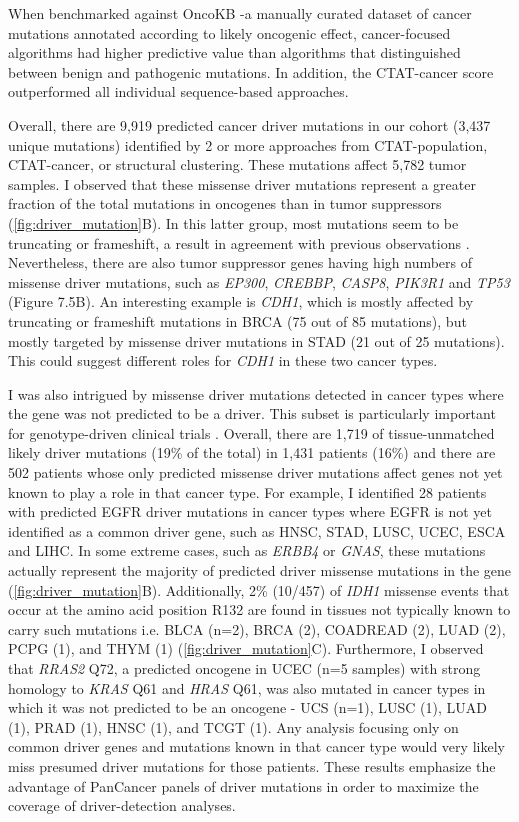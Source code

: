 When benchmarked against OncoKB \cite{RN144}-a manually curated dataset of cancer mutations annotated according to likely oncogenic effect, cancer-focused algorithms had higher predictive value than algorithms that distinguished between benign and pathogenic mutations. In addition, the CTAT-cancer score outperformed all individual sequence-based approaches. 

Overall, there are 9,919 predicted cancer driver mutations in our cohort (3,437 unique mutations) identified by 2 or more approaches from CTAT-population, CTAT-cancer, or structural clustering. These mutations affect 5,782 tumor samples. I observed that these missense driver mutations represent a greater fraction of the total mutations in oncogenes than in tumor suppressors (\autoref{fig:driver_mutation}B). In this latter group, most mutations seem to be truncating or frameshift, a result in agreement with previous observations \cite{RN185}. Nevertheless, there are also tumor suppressor genes having high numbers of missense driver mutations, such as \textit{EP300}, \textit{CREBBP}, \textit{CASP8}, \textit{PIK3R1} and \textit{TP53} (Figure 7.5B). An interesting example is \textit{CDH1}, which is mostly affected by truncating or frameshift mutations in BRCA (75 out of 85 mutations), but mostly targeted by missense driver mutations in STAD (21 out of 25 mutations). This could suggest different roles for \textit{CDH1} in these two cancer types.

I was also intrigued by missense driver mutations detected in cancer types where the gene was not predicted to be a driver. This subset is particularly important for genotype-driven clinical trials \cite{RN186}. Overall, there are 1,719 of tissue-unmatched likely driver mutations (19\% of the total) in 1,431 patients (16\%) and there are 502 patients whose only predicted missense driver mutations affect genes not yet known to play a role in that cancer type. For example, I identified 28 patients with predicted EGFR driver mutations in cancer types where EGFR is not yet identified as a common driver gene, such as HNSC, STAD, LUSC, UCEC, ESCA and LIHC. In some extreme cases, such as \textit{ERBB4} or \textit{GNAS}, these mutations actually represent the majority of predicted driver missense mutations in the gene (\autoref{fig:driver_mutation}B). Additionally, 2\% (10/457) of \textit{IDH1} missense events that occur at the amino acid position R132 are found in tissues not typically known to carry such mutations i.e. BLCA (n=2), BRCA (2), COADREAD (2), LUAD (2), PCPG (1), and THYM (1) (\autoref{fig:driver_mutation}C). Furthermore, I observed that \textit{RRAS2} Q72, a predicted oncogene in UCEC (n=5 samples) with strong homology to \textit{KRAS} Q61 and \textit{HRAS} Q61, was also mutated in cancer types in which it was not predicted to be an oncogene - UCS (n=1), LUSC (1), LUAD (1), PRAD (1), HNSC (1), and TCGT (1). Any analysis focusing only on common driver genes and mutations known in that cancer type would very likely miss presumed driver mutations for those patients. These results emphasize the advantage of PanCancer panels of driver mutations in order to maximize the coverage of driver-detection analyses.


